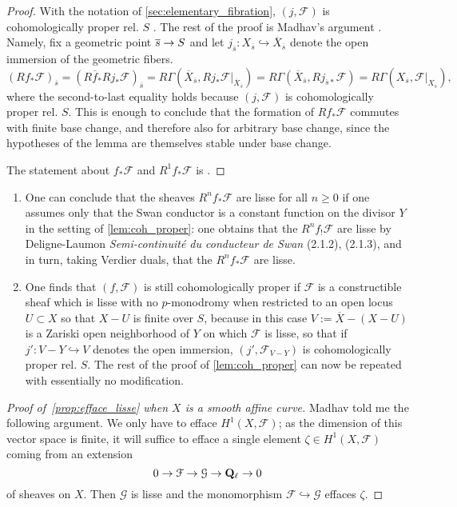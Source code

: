 \documentclass[deligne.tex]{subfiles}
\begin{document}
\begin{proof}
With the notation of \eqref{sec:elementary_fibration}, $(j,\mathcal F)$
is cohomologically proper rel. $S$ \cite[1.3.3]{Illusie}. The rest of the
proof is Madhav's argument \cite[1.3A]{Nori}. Namely, fix a geometric point
$\overline s\rightarrow S$ and let
$j_{\overline s}:X_{\overline s}\hookrightarrow\overline X_{\overline s}$
denote the open immersion of the geometric fibers.
\begin{equation*}
	(Rf_*\mathcal F)_{\overline s}
	=(R\overline f_*Rj_*\mathcal F)_{\overline s}
	=R\Gamma(\overline X_{\overline s},Rj_*\mathcal F|_{\overline X_{\overline s}})
	=R\Gamma(\overline X_{\overline s},Rj_{\overline s*}\mathcal F)
	=R\Gamma(X_{\overline s},\mathcal F|_{X_{\overline s}}),
\end{equation*}
where the second-to-last equality holds because $(j,\mathcal F)$ is
cohomologically proper rel. $S$.
This is enough to conclude that the formation of $Rf_*\mathcal F$ commutes
with finite base change, and therefore also for arbitrary base change, since
the hypotheses of the lemma are themselves stable under base change.

The statement about $f_*\mathcal F$ and $R^1f_*\mathcal F$ is
\cite[XIII 1.14, 1.16]{SGA1}.
\end{proof}
\begin{remark}\begin{enumerate}
	\item One can conclude that the sheaves $R^nf_*\mathcal F$ are lisse for
	all $n\geq0$ if one assumes only that the Swan conductor is a constant
	function on the divisor $Y$ in the setting of \eqref{lem:coh_proper}:
	one obtains that the $R^nf_!\mathcal F$ are lisse by Deligne-Laumon
	\emph{Semi-continuité du conducteur de Swan} (2.1.2), (2.1.3),
	and in turn, taking Verdier duals, that the $R^nf_*\mathcal F$ are lisse.
	\item One finds that $(f,\mathcal F)$ is still cohomologically proper
	if $\mathcal F$ is a constructible sheaf which is lisse with no
	$p$-monodromy when restricted to an open locus
	$U\subset X$ so that $X-U$ is finite over $S$, because in this case
	$V:=\overline X-(X-U)$ is a Zariski open neighborhood of $Y$ on which
	$\mathcal F$ is lisse, so that if $j':V-Y\hookrightarrow V$ denotes the
	open immersion, $(j',\mathcal F_{V-Y})$ is cohomologically proper rel. 
	$S$. The rest of the proof of \eqref{lem:coh_proper} can now be repeated
	with essentially no modification.
\end{enumerate}
\end{remark}
\begin{proof}[Proof of~\eqref{prop:efface_lisse} when $X$ is a smooth affine curve]
Madhav told me the following argument.
We only have to efface $H^1(X,\mathcal F)$; as the dimension of this vector
space is finite, it will suffice to efface a single element
$\zeta\in H^1(X,\mathcal F)$ coming from an extension
\begin{equation*}
	0\rightarrow\mathcal F\rightarrow\mathcal G\rightarrow\mathbf{Q}_\ell\rightarrow0
\end{equation*}
of sheaves on $X$. Then $\mathcal G$ is lisse and
the monomorphism $\mathcal F\hookrightarrow\mathcal G$ effaces $\zeta$.
\end{proof}
\end{document}
